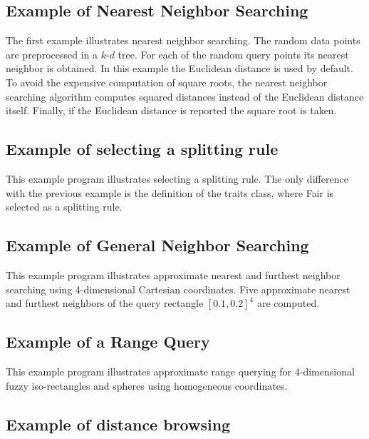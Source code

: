 \subsection{Example of Nearest Neighbor Searching}

The first example illustrates nearest neighbor searching. The random data points are preprocessed
in a $k$-$d$ tree. For each of the random query points its nearest neighbor is obtained.
In this example
the Euclidean distance is used by default. To avoid the expensive computation
of square roots, the nearest neighbor searching algorithm computes
squared distances instead of the Euclidean distance itself. 
Finally, if the Euclidean distance is reported the square root is taken.


\subsection{Example of selecting a splitting rule}

This example program illustrates selecting a splitting rule.
The only difference with the previous example is the
definition of the traits class, where Fair is selected as a splitting rule.


\subsection{Example of General Neighbor Searching}

This example program illustrates approximate nearest and furthest neighbor searching
using 4-dimensional Cartesian coordinates.
Five approximate nearest and furthest neighbors of
the query rectangle $[0.1,0.2]^4$ are computed.
 

\subsection{Example of a Range Query}

This example program illustrates approximate range querying for
4-dimensional fuzzy iso-rectangles and spheres
using homogeneous coordinates.



\subsection{Example of distance browsing}

